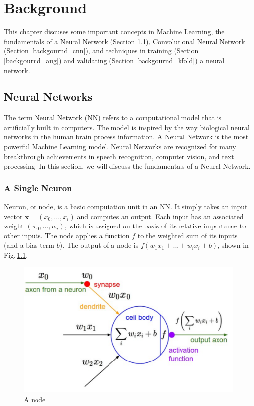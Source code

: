 \chapter{Background} 
\label{background} 
This chapter discuses some important concepts in Machine Learning, the fundamentals of a Neural Network (Section \ref{backgournd_nn}), Convolutional Neural Network (Section \ref{backgournd_cnn}), and techniques in training (Section \ref{backgournd_aug}) and validating (Section \ref{backgournd_kfold}) a neural network.


\section{Neural Networks}
\label{backgournd_nn}

The term Neural Network (NN) refers to a computational model that is artificially built in computers. The model is inspired by the way biological neural networks in the human brain process information. A Neural Network is the most powerful Machine Learning model. Neural Networks are recognized for many breakthrough achievements in speech recognition, computer vision, and text processing. In this section, we will discuss the fundamentals of a Neural Network.

\subsection{A Single Neuron}
Neuron, or node, is a basic computation unit in an NN. It simply takes an input vector $\mathbf{x} = (x_0,...,x_i)$ and computes an output. Each input has an associated weight $(w_0,...,w_i)$, which is assigned on the basis of its relative importance to other inputs. The node applies a function $f$ to the weighted sum of its inputs (and a bias term $b$). The output of a node is $f(w_1x_1 +...+ w_ix_i + b)$, shown in Fig.\,\ref{node}.
\begin{figure}
	\centering
	\includegraphics[scale=0.5]{Figs/node.png}
    \caption{A node \citep{cs231n}}
    \label{node}
\end{figure}

